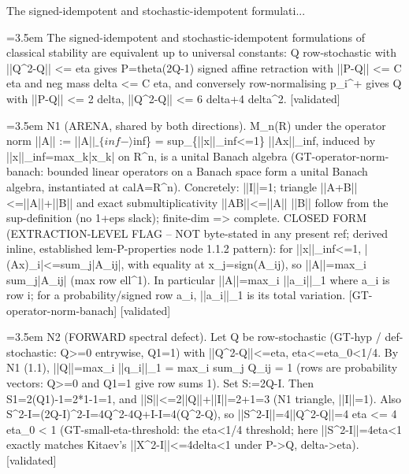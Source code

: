 \documentclass{article}
\newcommand{\step}[1]{\par\noindent\hangindent=3.5em\hangafter=1%
  \makebox[3.5em][l]{\textbf{#1.}}}
\newcommand{\steptag}[1]{\hfill{\small\textsf{[#1]}}}
\begin{document}
\begin{proofbox}{The signed-idempotent and stochastic-idempotent formulati...}
\step{1} The signed-idempotent and stochastic-idempotent formulations of classical stability are equivalent up to universal constants: Q row-stochastic with ||Q\textasciicircum{}2-Q|| <= eta gives P=theta(2Q-1) signed affine retraction with ||P-Q|| <= C eta and neg mass delta <= C eta, and conversely row-normalising p\_i\textasciicircum{}+ gives Q with ||P-Q|| <= 2 delta, ||Q\textasciicircum{}2-Q|| <= 6 delta+4 delta\textasciicircum{}2. \steptag{validated} \\[6pt]
\step{1.1} N1 (ARENA, shared by both directions). M\_n(R) under the operator norm ||A|| := ||A|$|\_\{inf-\rangle$inf\} = sup\_\{||x||\_inf<=1\} ||Ax||\_inf, induced by ||x||\_inf=max\_k|x\_k| on R\textasciicircum{}n, is a unital Banach algebra (GT-operator-norm-banach: bounded linear operators on a Banach space form a unital Banach algebra, instantiated at calA=R\textasciicircum{}n). Concretely: ||I||=1; triangle ||A+B||<=||A||+||B|| and exact submultiplicativity ||AB||<=||A|| ||B|| follow from the sup-definition (no 1+eps slack); finite-dim => complete. CLOSED FORM (EXTRACTION-LEVEL FLAG -- NOT byte-stated in any present ref; derived inline, established lem-P-properties node 1.1.2 pattern): for ||x||\_inf<=1, |(Ax)\_i|<=sum\_j|A\_ij|, with equality at x\_j=sign(A\_ij), so ||A||=max\_i sum\_j|A\_ij| (max row ell\textasciicircum{}1). In particular ||A||=max\_i ||a\_i||\_1 where a\_i is row i; for a probability/signed row a\_i, ||a\_i||\_1 is its total variation. [GT-operator-norm-banach] \steptag{validated} \\[4pt]
\step{1.2} N2 (FORWARD spectral defect). Let Q be row-stochastic (GT-hyp / def-stochastic: Q>=0 entrywise, Q1=1) with ||Q\textasciicircum{}2-Q||<=eta, eta<=eta\_0<1/4. By N1 (1.1), ||Q||=max\_i ||q\_i||\_1 = max\_i sum\_j Q\_ij = 1 (rows are probability vectors: Q>=0 and Q1=1 give row sums 1). Set S:=2Q-I. Then S1=2(Q1)-1=2*1-1=1, and ||S||<=2||Q||+||I||=2+1=3 (N1 triangle, ||I||=1). Also S\textasciicircum{}2-I=(2Q-I)\textasciicircum{}2-I=4Q\textasciicircum{}2-4Q+I-I=4(Q\textasciicircum{}2-Q), so ||S\textasciicircum{}2-I||=4||Q\textasciicircum{}2-Q||=4 eta <= 4 eta\_0 < 1 (GT-small-eta-threshold: the eta<1/4 threshold; here ||S\textasciicircum{}2-I||=4eta<1 exactly matches Kitaev's ||X\textasciicircum{}2-I||<=4delta<1 under P->Q, delta->eta). \steptag{validated} \\[4pt]

\end{proofbox}
\end{document}
